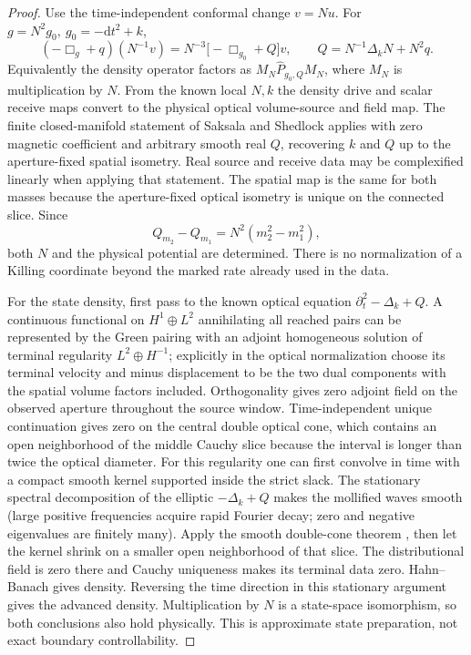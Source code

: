 \documentclass[11pt]{article}
\numberwithin{equation}{section}
\newcommand\dd{\mathrm d}
\begin{document}
\begin{proof}
Use the time-independent conformal change \(v=Nu\). For \(g=N^2g_0,\ g_0=-\dd t^2+k\),
\[
 (-\Box_g+q)(N^{-1}v)
 =N^{-3}\big[-\Box_{g_0}+Q\big]v,\qquad
 Q=N^{-1}\Delta_kN+N^2q .
\]
Equivalently the density operator factors as \(M_N\widehat P_{g_0,Q}M_N\), where \(M_N\) is multiplication by \(N\). From the known local \(N,k\) the density drive and scalar receive maps convert to the physical optical volume-source and field map. The finite closed-manifold statement of Saksala and Shedlock \cite[Theorem 1.1 and Remark 1.2]{Saksala} applies with zero magnetic coefficient and arbitrary smooth real \(Q\), recovering \(k\) and \(Q\) up to the aperture-fixed spatial isometry. Real source and receive data may be complexified linearly when applying that statement. The spatial map is the same for both masses because the aperture-fixed optical isometry is unique on the connected slice. Since
\[
 Q_{m_2}-Q_{m_1}=N^2(m_2^2-m_1^2),
\]
both \(N\) and the physical potential are determined. There is no normalization of a Killing coordinate beyond the marked rate already used in the data.

For the state density, first pass to the known optical equation \(\partial_t^2-\Delta_k+Q\). A continuous functional on \(H^1\oplus L^2\) annihilating all reached pairs can be represented by the Green pairing with an adjoint homogeneous solution of terminal regularity \(L^2\oplus H^{-1}\); explicitly in the optical normalization choose its terminal velocity and minus displacement to be the two dual components with the spatial volume factors included. Orthogonality gives zero adjoint field on the observed aperture throughout the source window. Time-independent unique continuation gives zero on the central double optical cone, which contains an open neighborhood of the middle Cauchy slice because the interval is longer than twice the optical diameter. For this regularity one can first convolve in time with a compact smooth kernel supported inside the strict slack. The stationary spectral decomposition of the elliptic \(-\Delta_k+Q\) makes the mollified waves smooth (large positive frequencies acquire rapid Fourier decay; zero and negative eigenvalues are finitely many). Apply the smooth double-cone theorem \cite[Theorem 2.25]{Saksala}, then let the kernel shrink on a smaller open neighborhood of that slice. The distributional field is zero there and Cauchy uniqueness makes its terminal data zero. Hahn--Banach gives density. Reversing the time direction in this stationary argument gives the advanced density. Multiplication by \(N\) is a state-space isomorphism, so both conclusions also hold physically. This is approximate state preparation, not exact boundary controllability.
\end{proof}
\end{document}
